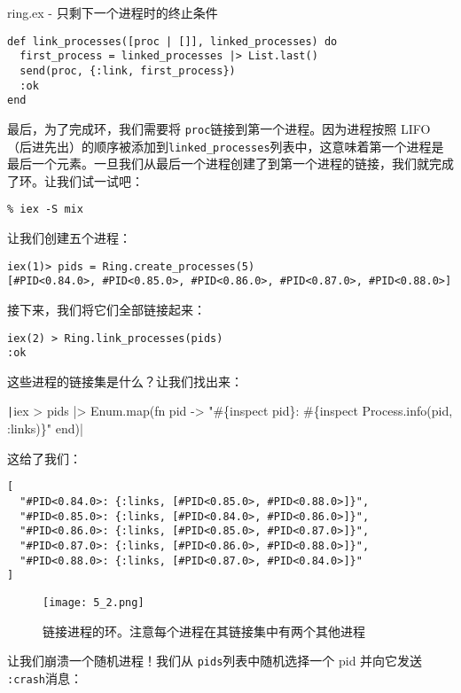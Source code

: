 \begin{code}{ring.ex - 只剩下一个进程时的终止条件}
\begin{verbatim}
def link_processes([proc | []], linked_processes) do
  first_process = linked_processes |> List.last()
  send(proc, {:link, first_process})
  :ok
end
\end{verbatim}
\label{lst:termination_condition_when_only_one_process_is_left}
\end{code}

最后，为了完成环，我们需要将 \texttt{proc}链接到第一个进程。因为进程按照 LIFO（后进先出）的顺序被添加到\texttt{linked\_processes}列表中，这意味着第一个进程是最后一个元素。一旦我们从最后一个进程创建了到第一个进程的链接，我们就完成了环。让我们试一试吧：

\texttt{\% iex -S mix}

让我们创建五个进程：
\begin{verbatim}
iex(1)> pids = Ring.create_processes(5)
[#PID<0.84.0>, #PID<0.85.0>, #PID<0.86.0>, #PID<0.87.0>, #PID<0.88.0>]
\end{verbatim}

接下来，我们将它们全部链接起来：
\begin{verbatim}
iex(2) > Ring.link_processes(pids)
:ok
\end{verbatim}

这些进程的链接集是什么？让我们找出来：

\texttt|iex > pids |> Enum.map(fn pid -> "\#\{inspect pid\}: \#\{inspect Process.info(pid, :links)\}" end)|

这给了我们：

\begin{code}{}
\begin{verbatim}
[
  "#PID<0.84.0>: {:links, [#PID<0.85.0>, #PID<0.88.0>]}",
  "#PID<0.85.0>: {:links, [#PID<0.84.0>, #PID<0.86.0>]}",
  "#PID<0.86.0>: {:links, [#PID<0.85.0>, #PID<0.87.0>]}",
  "#PID<0.87.0>: {:links, [#PID<0.86.0>, #PID<0.88.0>]}",
  "#PID<0.88.0>: {:links, [#PID<0.87.0>, #PID<0.84.0>]}"
]
\end{verbatim}
\end{code}

\begin{figure}[!ht]
    \centering
    \texttt{[image: 5\_2.png]}
    \caption{链接进程的环。注意每个进程在其链接集中有两个其他进程}
    \label{fig:5_2}
\end{figure}

让我们崩溃一个随机进程！我们从 \texttt{pids}列表中随机选择一个 pid 并向它发送 \texttt{:crash}消息：

